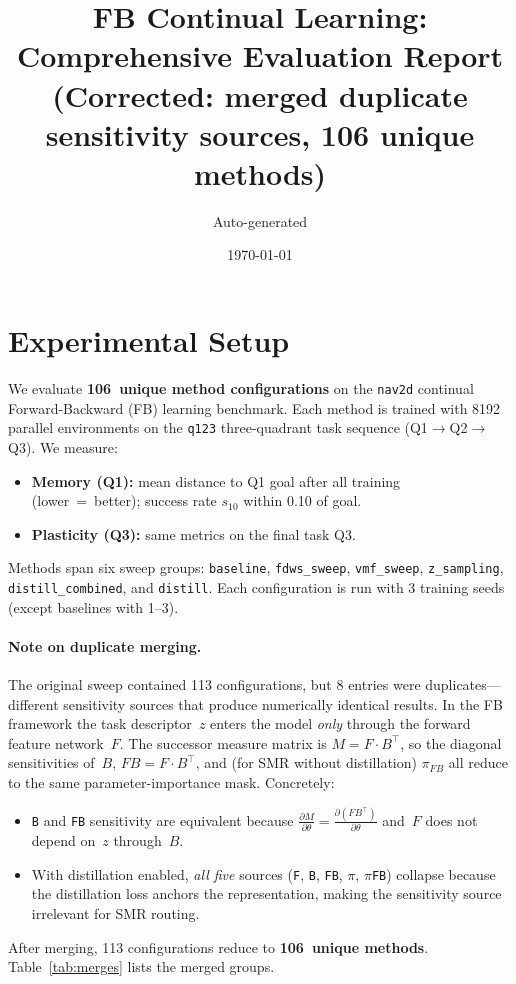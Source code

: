\documentclass[11pt,a4paper]{article}
\title{FB Continual Learning: Comprehensive Evaluation Report\\
\large (Corrected: merged duplicate sensitivity sources, 106 unique methods)}
\author{Auto-generated}
\date{\today}
\begin{document}
\maketitle

\section{Experimental Setup}
We evaluate \textbf{106\ unique method configurations} on the \texttt{nav2d} continual
Forward-Backward (FB) learning benchmark.  Each method is trained with 8192
parallel environments on the \texttt{q123} three-quadrant task sequence
(Q1$\to$Q2$\to$Q3).  We measure:
\begin{itemize}
  \item \textbf{Memory (Q1):} mean distance to Q1 goal after all training
        (lower~=~better);  success rate $s_{10}$ within 0.10 of goal.
  \item \textbf{Plasticity (Q3):} same metrics on the final task Q3.
\end{itemize}
Methods span six sweep groups: \texttt{baseline}, \texttt{fdws\_sweep},
\texttt{vmf\_sweep}, \texttt{z\_sampling}, \texttt{distill\_combined}, and
\texttt{distill}.  Each configuration is run with 3 training seeds (except
baselines with 1--3).

\paragraph{Note on duplicate merging.}
The original sweep contained 113 configurations, but 8 entries were
duplicates---different sensitivity sources that produce numerically identical
results.  In the FB framework the task descriptor~$z$ enters the model
\emph{only} through the forward feature network~$F$.  The successor measure
matrix is $M = F \cdot B^\top$, so the diagonal sensitivities of~$B$,
$FB = F \cdot B^\top$, and (for SMR without distillation) $\pi_{FB}$ all
reduce to the same parameter-importance mask.  Concretely:
\begin{itemize}
  \item \texttt{B} and \texttt{FB} sensitivity are equivalent because
        $\frac{\partial M}{\partial \theta} = \frac{\partial (F B^\top)}{\partial \theta}$
        and~$F$ does not depend on~$z$ through~$B$.
  \item With distillation enabled, \emph{all five} sources
        (\texttt{F}, \texttt{B}, \texttt{FB}, \texttt{$\pi$}, \texttt{$\pi$FB})
        collapse because the distillation loss anchors the representation,
        making the sensitivity source irrelevant for SMR routing.
\end{itemize}
After merging, 113 configurations reduce to \textbf{106\ unique methods}.
Table~\ref{tab:merges} lists the merged groups.
\end{document}
